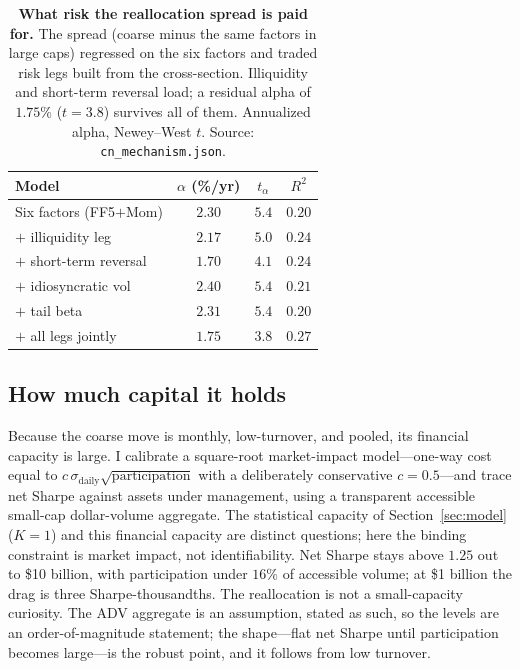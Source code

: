 \documentclass[12pt]{article}
\theoremstyle{plain}
\theoremstyle{definition}
\begin{document}
\begin{table}[t]
\centering
\caption{\textbf{What risk the reallocation spread is paid for.} The spread
(coarse minus the same factors in large caps) regressed on the six factors and
traded risk legs built from the cross-section. Illiquidity and short-term
reversal load; a residual alpha of $1.75\%$ ($t=3.8$) survives all of them.
Annualized alpha, Newey--West $t$. Source: \texttt{cn\_mechanism.json}.}
\label{tab:riskdecomp}
\small
\begin{tabular}{lccc}
\toprule
Model & $\alpha$ (\%/yr) & $t_\alpha$ & $R^2$ \\
\midrule
Six factors (FF5$+$Mom)        & $2.30$ & $5.4$ & $0.20$ \\
\quad $+$ illiquidity leg       & $2.17$ & $5.0$ & $0.24$ \\
\quad $+$ short-term reversal   & $1.70$ & $4.1$ & $0.24$ \\
\quad $+$ idiosyncratic vol     & $2.40$ & $5.4$ & $0.21$ \\
\quad $+$ tail beta             & $2.31$ & $5.4$ & $0.20$ \\
\quad $+$ all legs jointly      & $1.75$ & $3.8$ & $0.27$ \\
\bottomrule
\end{tabular}
\end{table}

\subsection{How much capital it holds}
Because the coarse move is monthly, low-turnover, and pooled, its financial
capacity is large. I calibrate a square-root market-impact model---one-way cost
equal to $c\,\sigma_{\text{daily}}\sqrt{\text{participation}}$ with a deliberately
conservative $c=0.5$---and trace net Sharpe against assets under management, using
a transparent accessible small-cap dollar-volume aggregate. The statistical
capacity of Section~\ref{sec:model} ($K=1$) and this financial capacity are
distinct questions; here the binding constraint is market impact, not
identifiability. Net Sharpe stays above $1.25$ out to \$10 billion, with
participation under $16\%$ of accessible volume; at \$1 billion the drag is three
Sharpe-thousandths. The reallocation is not a small-capacity curiosity. The ADV
aggregate is an assumption, stated as such, so the levels are an order-of-magnitude
statement; the shape---flat net Sharpe until participation becomes large---is the
robust point, and it follows from low turnover.
\end{document}
